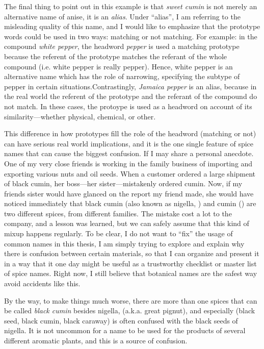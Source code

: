 The final thing to point out in this example is that \textit{sweet cumin} is not merely an alternative name of anise, it is an \textit{alias}. Under ``alias'', I am referring to the misleading quality of this name, and I would like to emphasize that the prototype words could be used in two ways: matching or not matching. For example: in the compound \textit{white pepper}, the headword \textit{pepper} is used a matching prototype because the referent of the prototype matches the referant of the whole compound (i.e. white pepper is really pepper). Hence, white pepper is an alternative name which has the role of narrowing, specifying the subtype of pepper in certain situations.Contrastingly, \textit{Jamaica pepper} is an alias, because in the real world the referent of the prototype and the referant of the compound do not match. In these cases, the protoype is used as a headword on account of its similarity---whether physical, chemical, or other.

This difference in how prototypes fill the role of the headword (matching or not) can have serious real world implications, and it is the one single feature of spice names that can cause the biggest confusion. If I may share a personal anecdote. One of my very close friends is working in the family business of importing and exporting various nuts and oil seeds. When a customer ordered a large shipment of black cumin, her boss---her sister---mistakenly ordered cumin. Now, if my friends sister would have glanced on the report my friend made, she would have noticed immediately that black cumin (also known as nigella, ) and cumin () are two different spices, from different families. The mistake cost a lot to the company, and a lesson was learned, but we can safely assume that this kind of mixup happens regularly. To be clear, I do not want to ``fix'' the usage of common names in this thesis, I am simply trying to explore and explain why there is confusion between certain materials, so that I can organize and present it in a way that it one day might be useful as a trustworthy checklist or master list of spice names. Right now, I still believe that botanical names are the safest way avoid accidents like this. 

By the way, to make things much worse, there are more than one spices that can be called \textit{black cumin} besides nigella,  (a.k.a. great pignut), and especially  (black seed, black cumin, black caraway) is often confused with the black seeds of nigella. It is not uncommon for a name to be used for the products of several different aromatic plants, and this is a source of confusion.

